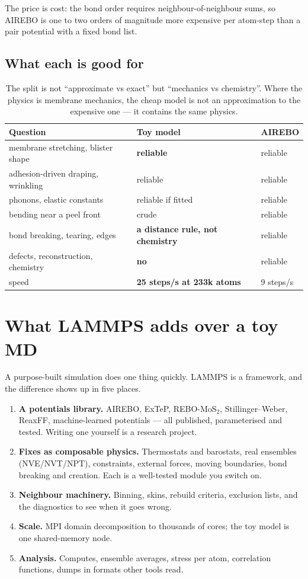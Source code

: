 \documentclass[11pt,a4paper]{article}
\begin{document}
The price is cost: the bond order requires neighbour-of-neighbour sums, so
AIREBO is one to two orders of magnitude more expensive per atom-step than a
pair potential with a fixed bond list.

\subsection{What each is good for}

\begin{table}[h]\centering\small
\begin{tabular}{lll}
\toprule
Question & Toy model & AIREBO \\
\midrule
membrane stretching, blister shape & \textbf{reliable} & reliable \\
adhesion-driven draping, wrinkling & reliable & reliable \\
phonons, elastic constants & reliable if fitted & reliable \\
bending near a peel front & crude & reliable \\
bond breaking, tearing, edges & \textbf{a distance rule, not chemistry} & reliable \\
defects, reconstruction, chemistry & \textbf{no} & reliable \\
speed & \textbf{25 steps/s at 233k atoms} & 9 steps/s \\
\bottomrule
\end{tabular}
\caption{The split is not ``approximate vs exact'' but ``mechanics vs
chemistry''. Where the physics is membrane mechanics, the cheap model is not an
approximation to the expensive one --- it contains the same physics.}
\end{table}

\section{What LAMMPS adds over a toy MD}

A purpose-built simulation does one thing quickly. LAMMPS is a framework, and
the difference shows up in five places.

\begin{enumerate}
\item \textbf{A potentials library.} AIREBO, ExTeP, REBO-MoS$_2$, Stillinger--Weber,
      ReaxFF, machine-learned potentials --- all published, parameterised and
      tested. Writing one yourself is a research project.
\item \textbf{Fixes as composable physics.} Thermostats and barostats, real
      ensembles (NVE/NVT/NPT), constraints, external forces, moving boundaries,
      bond breaking and creation. Each is a well-tested module you switch on.
\item \textbf{Neighbour machinery.} Binning, skins, rebuild criteria, exclusion
      lists, and the diagnostics to see when it goes wrong.
\item \textbf{Scale.} MPI domain decomposition to thousands of cores; the toy
      model is one shared-memory node.
\item \textbf{Analysis.} Computes, ensemble averages, stress per atom,
      correlation functions, dumps in formats other tools read.
\end{enumerate}
\end{document}

